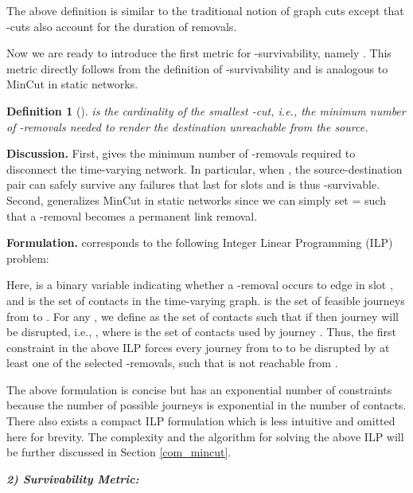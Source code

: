 \documentclass[10pt, conference, letterpaper]{IEEEtran}
\newtheorem{definition}{Definition}
\begin{document}
\noindent  The above definition is similar to the traditional notion of graph cuts except that -cuts also account for the duration of removals.

Now we are ready to introduce the first metric for -survivability, namely . This metric directly follows from the definition of -survivability and is analogous to MinCut in static networks.

\begin{definition}[\textbf{}]\label{mincut_def}
 is the cardinality of the smallest -cut, i.e., the minimum number of -removals needed to render the destination unreachable from the source.
\end{definition}

\noindent \textbf{Discussion.} First,  gives the minimum number of -removals required to disconnect the time-varying network.
In particular, when , the source-destination pair can safely survive any  failures that last for  slots and is thus -survivable.
Second,  generalizes MinCut in static networks since we can simply set  =  such that a -removal becomes a permanent link removal.



\vspace{1mm}

\noindent \textbf{Formulation.}  corresponds to the following Integer Linear Programming (ILP) problem:

Here,  is a binary variable indicating whether a -removal occurs to edge  in slot , and  is the set of contacts in the time-varying graph.  is the set of feasible journeys from  to . For any , we define  as the set of contacts  such that if  then journey  will be disrupted, i.e., , where  is the set of contacts used by journey . Thus, the first constraint in the above ILP forces every journey from  to  to be disrupted by at least one of the selected -removals, such that  is not reachable from .

The above formulation is concise but has an exponential number of constraints because the number of possible journeys is exponential in the number of contacts. There also exists a compact ILP formulation which is less intuitive and omitted here for brevity. The complexity and the algorithm for solving the above ILP will be further discussed in Section \ref{com_mincut}.

\vspace{1mm}

\noindent \emph{\textbf{2) Survivability Metric: }}

\vspace{1mm}
\end{document}
